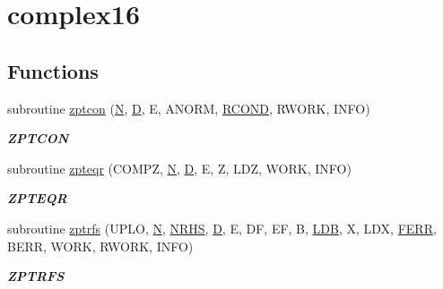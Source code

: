 \hypertarget{group__complex16PTcomputational}{}\section{complex16}
\label{group__complex16PTcomputational}
\subsection*{Functions}
\begin{DoxyCompactItemize}
\item 
subroutine \hyperlink{group__complex16PTcomputational_gae93ce2977fc454e3b4362e894d8b54df}{zptcon} (\hyperlink{polmisc_8c_a0240ac851181b84ac374872dc5434ee4}{N}, \hyperlink{odrpack_8h_a7dae6ea403d00f3687f24a874e67d139}{D}, E, A\+N\+O\+R\+M, \hyperlink{superlu__enum__consts_8h_af00a42ecad444bbda75cde1b64bd7e72a9b5c151728d8512307565994c89919d5}{R\+C\+O\+N\+D}, R\+W\+O\+R\+K, I\+N\+F\+O)
\begin{DoxyCompactList}\small\item\em {\bfseries Z\+P\+T\+C\+O\+N} \end{DoxyCompactList}\item 
subroutine \hyperlink{group__complex16PTcomputational_ga08d07a22ba5f50a14d9caf644723b5c3}{zpteqr} (C\+O\+M\+P\+Z, \hyperlink{polmisc_8c_a0240ac851181b84ac374872dc5434ee4}{N}, \hyperlink{odrpack_8h_a7dae6ea403d00f3687f24a874e67d139}{D}, E, Z, L\+D\+Z, W\+O\+R\+K, I\+N\+F\+O)
\begin{DoxyCompactList}\small\item\em {\bfseries Z\+P\+T\+E\+Q\+R} \end{DoxyCompactList}\item 
subroutine \hyperlink{group__complex16PTcomputational_ga93372dc1bb896550f56db40a44b3f202}{zptrfs} (U\+P\+L\+O, \hyperlink{polmisc_8c_a0240ac851181b84ac374872dc5434ee4}{N}, \hyperlink{example__user_8c_aa0138da002ce2a90360df2f521eb3198}{N\+R\+H\+S}, \hyperlink{odrpack_8h_a7dae6ea403d00f3687f24a874e67d139}{D}, E, D\+F, E\+F, B, \hyperlink{example__user_8c_a50e90a7104df172b5a89a06c47fcca04}{L\+D\+B}, X, L\+D\+X, \hyperlink{superlu__enum__consts_8h_af00a42ecad444bbda75cde1b64bd7e72a78fd14d7abebae04095cfbe02928f153}{F\+E\+R\+R}, B\+E\+R\+R, W\+O\+R\+K, R\+W\+O\+R\+K, I\+N\+F\+O)
\begin{DoxyCompactList}\small\item\em {\bfseries Z\+P\+T\+R\+F\+S} \end{DoxyCompactList}\item 

\end{DoxyCompactItemize}
